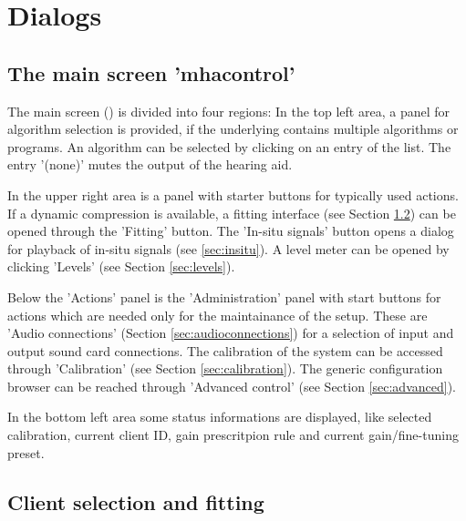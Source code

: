 \documentclass[11pt,a4paper,twoside]{article}
\newcommand{\+}{\discretionary{\mbox{\scriptsize$\hookleftarrow$}}{}{}}
\begin{document}
\section{Dialogs}

\subsection{The main screen 'mhacontrol'}

The main screen () is divided into four regions:
%
In the top left area, a panel for algorithm selection is provided, if the underlying
\mha{} contains multiple algorithms or programs.
%
An algorithm can
be selected by clicking on an entry of the list.
%
The entry '(none)' mutes the output of the hearing aid.

In the upper right area is a panel with starter buttons for typically
used actions.
%
If a dynamic compression is available, a fitting interface (see
Section \ref{sec:fitting}) can be opened through the 'Fitting' button.
%
The 'In-situ signals' button opens a dialog for playback of in-situ
signals (see \ref{sec:insitu}).
%
A level meter can be opened by clicking 'Levels' (see Section
\ref{sec:levels}).

Below the 'Actions' panel is the 'Administration'
panel with start buttons for actions which are
needed only for the maintainance of the \mha{} setup.
%
These are 'Audio connections' (Section \ref{sec:audioconnections}) for
a selection of input and output sound card connections.
%
The calibration of the system can be accessed through 'Calibration'
(see Section \ref{sec:calibration}).
%
The generic \mha{} configuration browser can be reached through 'Advanced
control' (see Section \ref{sec:advanced}).

In the bottom left area some status informations are displayed, like selected
calibration, current client ID,
gain prescritpion rule and current gain/fine-tuning
preset.


\subsection{Client selection and fitting}\label{sec:fitting}
\end{document}
